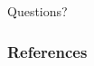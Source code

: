 \documentclass{beamer}
\renewcommand\emph[1]{{\color{vuborange}#1}}
\begin{document}
	\begin{frame}
		\begin{center}
			{\huge Questions?}
		\end{center}

		
		
	\end{frame}

	
	\begin{frame}[allowframebreaks]
		\frametitle{References}
		
		
	\end{frame}
	

	
\end{document}
